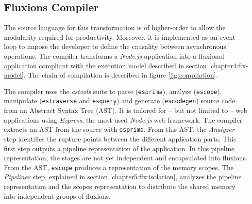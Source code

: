 \subsection{Fluxions Compiler} \label{chapter5:flx:compiler}

The source language for this transformation is of higher-order to allow the modularity required for productivity. 
Moreover, it is implemented as an event-loop to impose the developer to define the causality between asynchronous operations.
The compiler transforms a \textit{Node.js} application into a fluxional application compliant with the execution model described in section \ref{chapter4:flx-model}.
The chain of compilation is described in figure \ref{fig:compilation}.

\begin{figure}%
\end{figure}

The compiler uses the \textit{estools} suite to parse (\texttt{esprima}), analyze (\texttt{escope}), manipulate (\texttt{estraverse} and \texttt{esquery}) and generate (\texttt{escodegen}) source code from an Abstract Syntax Tree (AST).
It is tailored for -- but not limited to -- web applications using \textit{Express}, the most used \textit{Node.js} web framework.
The compiler extracts an AST from the source with \texttt{esprima}.
From this AST, the \textit{Analyzer} step identifies the rupture points between the different application parts. %
This first step outputs a pipeline representation of the application.
In this pipeline representation, the stages are not yet independent and encapsulated into fluxions.
From the AST, \texttt{escope} produces a representation of the memory scopes.
The \textit{Pipeliner} step, explained in section \ref{chapter5:flx:isolation}, analyzes the pipeline representation and the scopes representation to distribute the shared memory into independent groups of fluxions.

